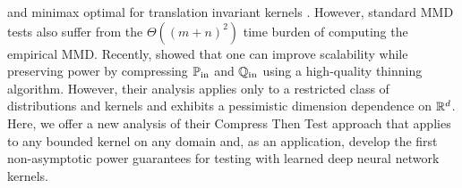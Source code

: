 and minimax optimal for translation invariant kernels \citep[Thm.~8]{kim2023differentially}.
However, standard MMD tests also suffer from the $\Theta((m+n)^2)$ time burden of computing the empirical MMD.
Recently, \citet{domingoenrich2023compresstestpowerfulkernel} showed that one can improve scalability while preserving power by compressing $\mathbb{P}_{\textup{in}}$ and $\mathbb{Q}_{\textup{in}}$ using a high-quality thinning algorithm.  However, their analysis applies only to a restricted class of distributions and kernels and exhibits a pessimistic dimension dependence on $\mathbb{R}^d$.  Here, we offer a new analysis of their Compress Then Test approach that applies to any bounded kernel on any domain and, as an application, develop the first non-asymptotic power guarantees for testing with learned deep neural network kernels.

%
%
%
%
%

%
%
%
%
%

%
%
%

%
